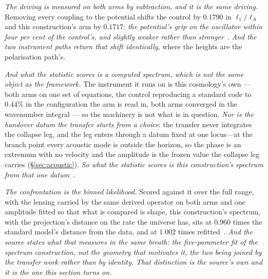 \documentclass[11pt,a4paper]{article}
\theoremstyle{plain}
\theoremstyle{definition}
\begin{document}
\emph{The driving is measured on both arms by subtraction, and it is the same driving.} Removing every
coupling to the potential shifts the control by $0.1790$ in $\ell_1/\ell_A$ and this construction's arm by
$0.1717$: \emph{the potential's grip on the oscillator within four per cent of the control's, and slightly
weaker rather than stronger}~\cite{JanzenCRcosmology}. \emph{And the two instrument paths return that shift
identically}, where the heights are the polarisation path's.

\emph{And what the statistic scores is a computed spectrum, which is not the same object as the framework.}
The instrument it runs on is this cosmology's own --- both arms on one set of equations, the control
reproducing a standard code to $0.44\%$ in the configuration the arm is read in, both arms converged in the
wavenumber integral --- so the machinery is not what is in question. \emph{Nor is the handover datum the
transfer starts from a choice}: the transfer never integrates the collapse leg, and the leg enters through a
datum fixed at one locus---at the branch point every acoustic mode is outside the horizon, so the phase is an
extremum with no velocity and the amplitude is the frozen value the collapse leg carries (\S\ref{sec:acoustic}).
\emph{So what the statistic scores is this construction's spectrum from that one datum}~\cite{JanzenCRcosmology}.

\emph{The confrontation is the binned likelihood.} Scored against it over the full range, with the lensing carried by the same derived operator on
both arms and one amplitude fitted so that what is compared is shape, this construction's spectrum, with the projection's distance on the rate the universe has, sits at
$0.960$ times the standard model's distance from the data, and at $1.002$ times refitted~\cite{JanzenCRcosmology}. \emph{And the source states what that measures in the same breath:
the five-parameter fit of the spectrum construction, not the geometry that motivates it, the two being joined
by the transfer work rather than by identity.} \emph{That distinction is the source's own and it is the one
this section turns on.}
\end{document}
